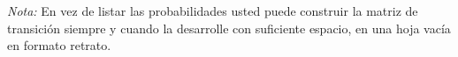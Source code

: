 \documentclass[ a4paper, twoside, 11pt]{article}
\begin{document}
\begin{problem}
\emph{Nota:} En vez de listar las probabilidades usted puede construir la matriz de transici\'on siempre y cuando la desarrolle con suficiente espacio, \eg en una hoja vac\'ia en formato retrato. 

\end{problem}
\vspace{\baselineskip}

\begin{problem}




\end{problem}
\vspace{\baselineskip}
\end{document}
